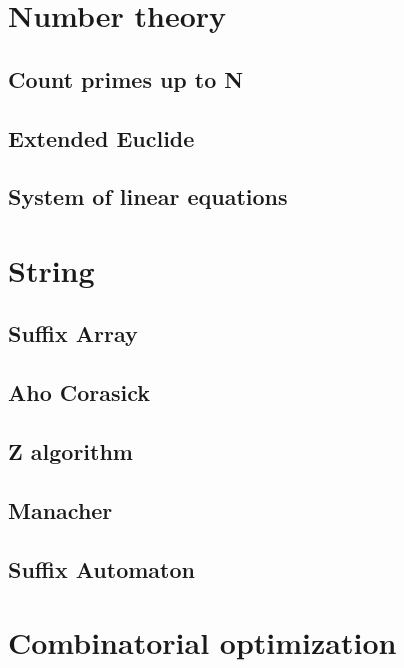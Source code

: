 \section{Number theory}
\subsection{Count primes up to N}
\raggedbottom
\hrulefill
\subsection{Extended Euclide}
\raggedbottom
\hrulefill
\subsection{System of linear equations}
\raggedbottom
\hrulefill

\section{String}
\subsection{Suffix Array}
\raggedbottom
\hrulefill
\subsection{Aho Corasick}
\raggedbottom
\hrulefill
\subsection{Z algorithm}
\raggedbottom
\hrulefill
\subsection{Manacher}
\raggedbottom
\hrulefill
\subsection{Suffix Automaton}
\raggedbottom
\hrulefill

\section{Combinatorial optimization}


